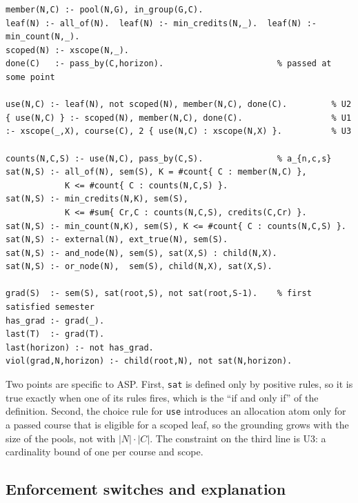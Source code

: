 \documentclass[10pt,a4paper]{article}
\begin{document}
\begin{lstlisting}
member(N,C) :- pool(N,G), in_group(G,C).
leaf(N) :- all_of(N).  leaf(N) :- min_credits(N,_).  leaf(N) :- min_count(N,_).
scoped(N) :- xscope(N,_).
done(C)   :- pass_by(C,horizon).                       % passed at some point
 
use(N,C) :- leaf(N), not scoped(N), member(N,C), done(C).         % U2
{ use(N,C) } :- scoped(N), member(N,C), done(C).                  % U1
:- xscope(_,X), course(C), 2 { use(N,C) : xscope(N,X) }.          % U3
 
counts(N,C,S) :- use(N,C), pass_by(C,S).               % a_{n,c,s}
sat(N,S) :- all_of(N), sem(S), K = #count{ C : member(N,C) },
            K <= #count{ C : counts(N,C,S) }.
sat(N,S) :- min_credits(N,K), sem(S),
            K <= #sum{ Cr,C : counts(N,C,S), credits(C,Cr) }.
sat(N,S) :- min_count(N,K), sem(S), K <= #count{ C : counts(N,C,S) }.
sat(N,S) :- external(N), ext_true(N), sem(S).
sat(N,S) :- and_node(N), sem(S), sat(X,S) : child(N,X).
sat(N,S) :- or_node(N),  sem(S), child(N,X), sat(X,S).
 
grad(S)  :- sem(S), sat(root,S), not sat(root,S-1).    % first satisfied semester
has_grad :- grad(_).
last(T)  :- grad(T).
last(horizon) :- not has_grad.
viol(grad,N,horizon) :- child(root,N), not sat(N,horizon).
\end{lstlisting}
Two points are specific to ASP. First, \texttt{sat} is defined only by
positive rules, so it is true exactly when one of its rules fires, which is
the ``if and only if'' of the definition. Second, the choice rule for
\texttt{use} introduces an allocation atom only for a passed course that is
eligible for a scoped leaf, so the grounding grows with the size of the
pools, not with $|N|\cdot|C|$. The constraint on the third line is U3: a
cardinality bound of one per course and scope.
 
\subsection{Enforcement switches and explanation}
\label{sec:explain}
 
\end{document}
